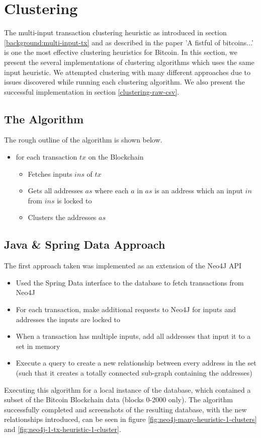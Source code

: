 \chapter{Clustering}\label{section-clustering}

The multi-input transaction clustering heuristic as introduced in section \ref{background:multi-input-tx} and as described in the paper 'A fistful of bitcoins...' \cite{Refworks:doc:5c3de7e3e4b0ea6196452d80} is one the most effective clustering heuristics for Bitcoin. In this section, we present the several implementations of clustering algorithms which uses the same input heuristic. We attempted clustering with many different approaches due to issues discovered while running each clustering algorithm. We also present the successful implementation in section \ref{clustering-raw-csv}.

\section{The Algorithm}
The rough outline of the algorithm is shown below.
\begin{itemize}
    \item for each transaction $tx$ on the Blockchain
    \begin{itemize}
        \item Fetches inputs $ins$ of $tx$
        \item Gets all addresses $as$ where each $a$ in $as$ is an address which an input  $in$ from $ins$ is locked to
        \item Clusters the addresses $as$
    \end{itemize}
\end{itemize}

\section{Java \& Spring Data Approach}
The first approach taken was implemented as an extension of the Neo4J API 
\begin{itemize}
    \item Used the Spring Data interface to the database to fetch transactions from Neo4J
    \item For each transaction, make additional requests to Neo4J for inputs and addresses the inputs are locked to
    \item When a transaction has multiple inputs, add all addresses that input it to a set in memory 
    \item Execute a query to create a new relationship between every address in the set (such that it creates a totally connected sub-graph containing the addresses)
\end{itemize}
Executing this algorithm for a local instance of the database, which contained a subset of the Bitcoin Blockchain data (blocks 0-2000 only). The algorithm successfully completed and screenshots of the resulting database, with the new relationships introduced, can be seen in figure \ref{fig:neo4j-many-heuristic-1-clusters} and \ref{fig:neo4j-1-tx-heuristic-1-cluster}. 

